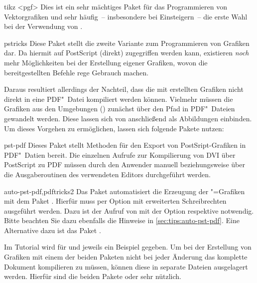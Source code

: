 \begin{packages}
\item[tikz]<pgf>
  Dies ist ein sehr mächtiges Paket für das Programmieren von Vektorgrafiken 
  und sehr häufig~-- insbesondere bei Einsteigern~-- die erste Wahl bei der 
  Verwendung von .
\item[pstricks]
  Diese Paket stellt die zweite Variante zum Programmieren von Grafiken dar. 
  Da hiermit auf PostScript (direkt) zugegriffen werden kann, existieren 
  \emph{noch} mehr Möglichkeiten bei der Erstellung eigener Grafiken, wovon
  die bereitgestellten Befehle rege Gebrauch machen. 
  
  Daraus resultiert allerdings der Nachteil, dass die mit  
  erstellten Grafiken nicht direkt in eine PDF"~Datei kompiliert werden können. 
  Vielmehr müssen die Grafiken aus den Umgebungen 
  () zunächst über den Pfad 
   in PDF"~Dateien gewandelt werden. Diese 
  lassen sich von  anschließend als Abbildungen einbinden. Um 
  dieses Vorgehen zu ermöglichen, lassen sich folgende Pakete nutzen:
  \begin{packages}
  \item[pst-pdf]
    Dieses Paket stellt Methoden für den Export von PostSript-Grafiken in 
    PDF"~Datien bereit. Die einzelnen Aufrufe zur Kompilierung von DVI über 
    PostScript zu PDF müssen durch den Anwender manuell beziehungsweise über 
    die Ausgaberoutinen des verwendeten Editors durchgeführt werden.
  \item[auto-pst-pdf,pdftricks2]
    Das Paket automatisiert die Erzeugung der "=Grafiken mit 
    dem Paket . Hierfür muss  per Option mit 
    erweiterten Schreibrechten ausgeführt werden. Dazu ist der Aufruf von 
     mit der Option  respektive 
     notwendig. Bitte beachten Sie dazu ebenfalls die 
    Hinweise in \autoref{sec:tips:auto-pst-pdf}. Eine Alternative dazu ist das 
    Paket .
  \end{packages}
\end{packages}
%
Im Tutorial  wird für  und  
jeweils ein Beispiel gegeben. Um bei der Erstellung von Grafiken mit einem der 
beiden Paketen nicht bei jeder Änderung das komplette Dokument kompilieren zu 
müssen, können diese in separate Dateien ausgelagert werden. Hierfür sind die 
beiden Pakete  oder  sehr nützlich.

